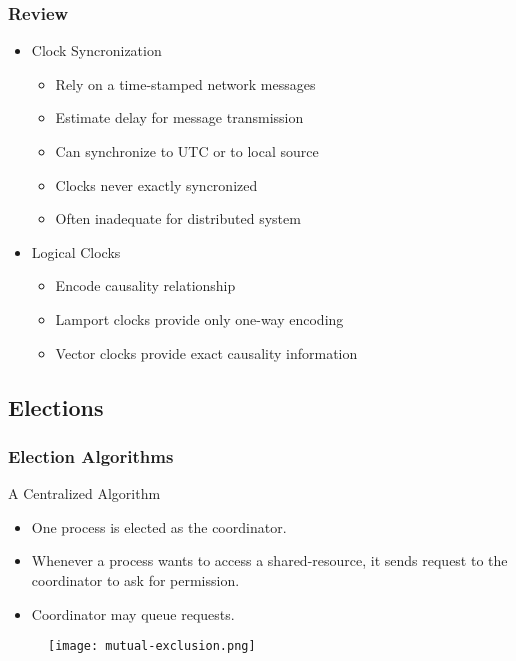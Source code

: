 \begin{frame}
    \frametitle{Review}
    \begin{itemize}
        \item Clock Syncronization
            \begin{itemize}
                \item Rely on a time-stamped network messages
                \item Estimate delay for message transmission
                \item Can synchronize to UTC or to local source
                \item Clocks never exactly syncronized
                \item Often inadequate for distributed system
            \end{itemize}
        \item Logical Clocks
            \begin{itemize}
                \item Encode causality relationship
                \item Lamport clocks provide only one-way encoding
                \item Vector clocks provide exact causality information
            \end{itemize}
    \end{itemize}
\end{frame}

\subsection{Elections}

\begin{frame}
    \frametitle{Election Algorithms}
A Centralized Algorithm
\begin{itemize}
    \item One process is elected as the coordinator.
    \item Whenever a process wants to access a shared-resource, it sends request to the coordinator to ask for permission.
    \item Coordinator may queue requests.
\end{itemize}
\begin{figure}
    \centering
    \texttt{[image: mutual-exclusion.png]}
\end{figure}

\end{frame}


